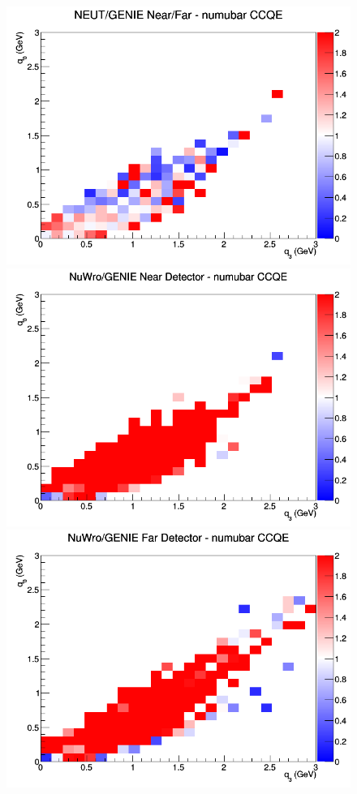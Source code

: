 \begin{figure}[h]
\endminipage
{}
\includegraphics[width=\linewidth]{eff_q0_q3/FGT/ratios/CCQE_NEUT_GENIE_numubar_NF_q3_q0.png}
\endminipage
\newline
{}
\includegraphics[width=\linewidth]{eff_q0_q3/FGT/ratios/CCQE_NuWro_GENIE_numubar_near_q3_q0.png}
\endminipage
{}
\includegraphics[width=\linewidth]{eff_q0_q3/FGT/ratios/CCQE_NuWro_GENIE_numubar_far_q3_q0.png}

\end{figure}

